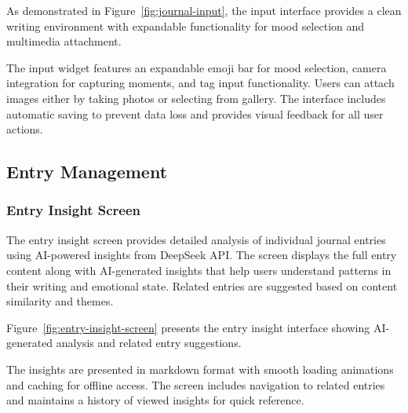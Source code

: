 As demonstrated in Figure~\ref{fig:journal-input}, the input interface provides a clean writing environment with expandable functionality for mood selection and multimedia attachment.


The input widget features an expandable emoji bar for mood selection, camera integration for capturing moments, and tag input functionality. Users can attach images either by taking photos or selecting from gallery. The interface includes automatic saving to prevent data loss and provides visual feedback for all user actions.

\subsection{Entry Management}

\subsubsection{Entry Insight Screen}

The entry insight screen provides detailed analysis of individual journal entries using AI-powered insights from DeepSeek API. The screen displays the full entry content along with AI-generated insights that help users understand patterns in their writing and emotional state. Related entries are suggested based on content similarity and themes.

Figure~\ref{fig:entry-insight-screen} presents the entry insight interface showing AI-generated analysis and related entry suggestions.


The insights are presented in markdown format with smooth loading animations and caching for offline access. The screen includes navigation to related entries and maintains a history of viewed insights for quick reference.

